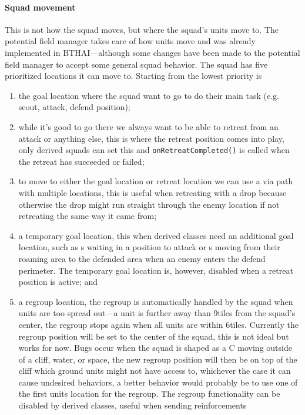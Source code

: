 \paragraph{Squad movement}
This is not how the squad moves, but where the squad's units move to. The potential field manager takes care of how units move and was already implemented in BTHAI—although some changes have been made to the potential field manager to accept some general squad behavior. The squad has five prioritized locations it can move to. Starting from the lowest priority is
\begin{enumerate}
	\item the goal location where the squad want to go to do their main task (e.g. scout, attack, defend position);
	\item while it's good to go there we always want to be able to retreat from an attack or anything else, this is where the retreat position comes into play, only derived squads can set this and \texttt{onRetreatCompleted()} is called when the retreat has succeeded or failed;
	\item to move to either the goal location or retreat location we can use a via path with multiple locations, this is useful when retreating with a drop because otherwise the drop might run straight through the enemy location if not retreating the same way it came from;
	\item a temporary goal location, this when derived classes need an additional goal location, such as s waiting in a position to attack or s moving from their roaming area to the defended area when an enemy enters the defend perimeter. The temporary goal location is, however, disabled when a retreat position is active; and
	\item a regroup location, the regroup is automatically handled by the squad when units are too spread out—a unit is further away than 9\conf tiles from the squad's center, the regroup stops again when all units are within 6\conf tiles. Currently the regroup position will be set to the center of the squad, this is not ideal but works for now. Bugs occur when the squad is shaped as a C moving outside of a cliff, water, or space, the new regroup position will then be on top of the cliff which ground units might not have access to, whichever the case it can cause undesired behaviors, a better behavior would probably be to use one of the first units location for the regroup. The regroup functionality can be disabled by derived classes, useful when sending reinforcements 
\end{enumerate}


